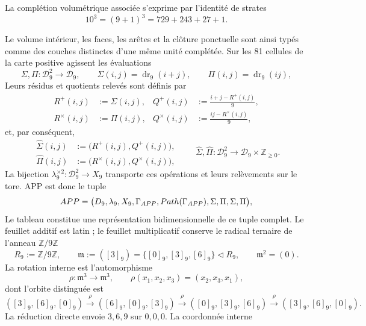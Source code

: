 La complétion volumétrique associée s'exprime par l'identité de
strates
\begin{equation}
10^3=(9+1)^3=729+243+27+1.
\label{p12-83-c3-s1:eq:completion-unit}
\end{equation}

Le volume intérieur, les faces, les arêtes et la clôture ponctuelle sont ainsi
typés comme des couches distinctes d'une même unité complétée. Sur les 81
cellules de la carte positive agissent les évaluations
\[
\Sigma,\Pi:\mathcal D_9^2\longrightarrow\mathcal D_9,
\qquad
\Sigma(i,j)=\operatorname{dr}_9(i+j),
\qquad
\Pi(i,j)=\operatorname{dr}_9(ij),
\]
Leurs résidus et quotients relevés sont définis par
\[
\begin{aligned}
R^+(i,j)&:=\Sigma(i,j),&
Q^+(i,j)&:=\frac{i+j-R^+(i,j)}9,\\
R^\times(i,j)&:=\Pi(i,j),&
Q^\times(i,j)&:=\frac{ij-R^\times(i,j)}9,
\end{aligned}
\]
et, par conséquent,
\[
\begin{aligned}
\widehat\Sigma(i,j)&:=\bigl(R^+(i,j),Q^+(i,j)\bigr),\\
\widehat\Pi(i,j)&:=\bigl(R^\times(i,j),Q^\times(i,j)\bigr),
\end{aligned}
\qquad
\widehat\Sigma,\widehat\Pi:
\mathcal D_9^2\longrightarrow\mathcal D_9\times\mathbb Z_{\geq0}.
\]
La bijection \(\lambda_9^{\times2}:\mathcal D_9^2\to X_9\) transporte
ces opérations et leurs relèvements sur le tore. APP est donc le tuple
\begin{equation}
\APP=\bigl(\mathcal D_9,\lambda_9,X_9,\Gamma_{\rm APP},
\operatorname{Path}(\Gamma_{\rm APP}),
\Sigma,\Pi,\widehat\Sigma,\widehat\Pi\bigr),
\label{p12-83-c3-s1:eq:app-full-definition-public}
\end{equation}
Le tableau constitue une représentation bidimensionnelle de ce tuple
complet. Le feuillet additif est latin ; le feuillet multiplicatif conserve
le radical ternaire de l'anneau \(\mathbb Z/9\mathbb Z\)
\begin{equation}
R_9:=\mathbb Z/9\mathbb Z,
\qquad
\mathfrak m:=([3]_9)=\{[0]_9,[3]_9,[6]_9\}\triangleleft R_9,
\qquad \mathfrak m^2=(0).
\label{p12-83-c3-s1:eq:app-radical-369}
\end{equation}
La rotation interne est l'automorphisme
\[
\rho:\mathfrak m^3\longrightarrow\mathfrak m^3,
\qquad \rho(x_1,x_2,x_3)=(x_2,x_3,x_1),
\]
dont l'orbite distinguée est
\[
([3]_9,[6]_9,[0]_9)\xrightarrow{\rho}
([6]_9,[0]_9,[3]_9)\xrightarrow{\rho}
([0]_9,[3]_9,[6]_9)\xrightarrow{\rho}
([3]_9,[6]_9,[0]_9).
\]
La réduction directe envoie \(3,6,9\) sur \(0,0,0\). La coordonnée interne
